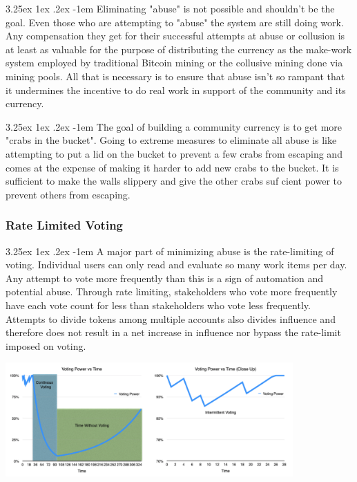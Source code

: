 \documentclass{article}
\makeatletter
\renewcommand\paragraph{\@startsection{paragraph}{5}{\z@}%
  {3.25ex \@plus1ex \@minus.2ex}%
  {-1em}%
  {\normalfont\normalsize\bfseries}}
\makeatother
\begin{document}
                    \paragraph{}
                        Eliminating "abuse" is not possible and shouldn't
be the goal. Even those who are attempting to "abuse" the system are still
doing work. Any compensation they get for their successful attempts at
abuse or collusion is at least as valuable for the purpose of distributing
the currency as the make-work system employed by traditional Bitcoin
mining or the collusive mining done via mining pools. All that is necessary
is to ensure that abuse isn't so rampant that it undermines the incentive
to do real work in support of the community and its currency.

                    \paragraph{}
                        The goal of building a community currency is to get
more "crabs in the bucket". Going to extreme measures to eliminate all
abuse is like attempting to put a lid on the bucket to prevent a few crabs
from escaping and comes at the expense of making it harder to add new crabs
to the bucket. It is sufficient to make the walls slippery and give the
other crabs suf cient power to prevent others from escaping.

            \subsubsection{Rate Limited Voting}

                \paragraph{}
                    A major part of minimizing abuse is the rate-limiting
of voting. Individual users can only read and evaluate so many work items
per day. Any attempt to vote more frequently than this is a sign of
automation and potential abuse. Through rate limiting, stakeholders who
vote more frequently have each vote count for less than stakeholders who
vote less frequently. Attempts to divide tokens among multiple accounts
also divides influence and therefore does not result in a net increase in
influence nor bypass the rate-limit imposed on voting.

                \includegraphics[width=11cm]{img_voting_rate_limiting}
\end{document}
